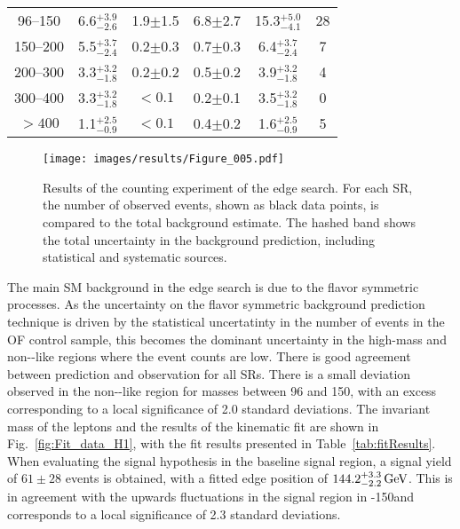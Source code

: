 \begin{table}[!hbtp]
\begin{tabular}{ c  c  c  c  c  c}
96--150   &  6.6$^{+3.9}_{-2.6}$    & 1.9$\pm$1.5   & 6.8$\pm$2.7  &  15.3$^{+5.0}_{-4.1}$ & 28 \\
150--200  &  5.5$^{+3.7}_{-2.4}$    & 0.2$\pm$0.3   & 0.7$\pm$0.3  &  6.4$^{+3.7}_{-2.4}$ & 7 \\
200--300  &  3.3$^{+3.2}_{-1.8}$    & 0.2$\pm$0.2   & 0.5$\pm$0.2  &  3.9$^{+3.2}_{-1.8}$ & 4 \\
300--400  &  3.3$^{+3.2}_{-1.8}$    & $< 0.1$       & 0.2$\pm$0.1  &  3.5$^{+3.2}_{-1.8}$ & 0 \\
$> 400$   &  1.1$^{+2.5}_{-0.9}$    & $< 0.1$       & 0.4$\pm$0.2  &  1.6$^{+2.5}_{-0.9}$ & 5 \\
\hline
\hline
\end{tabular}
\end{table}
\begin{figure}[htbp!]
\begin{center}
\texttt{[image: images/results/Figure\_005.pdf]}
\caption{Results of the counting experiment of the edge search. For each SR, the number of observed events, shown as black data points, is compared to the total background estimate.  The hashed band shows the total uncertainty in the background prediction, including statistical and systematic sources.}
\label{fig:edgeResults}
\end{center}
\end{figure}                                                                                                                                                               
The main SM background in the edge search is due to the flavor symmetric processes. 
As the uncertainty on the flavor symmetric background prediction technique is driven by the statistical uncertatinty in the number of events in the OF control sample, this becomes the dominant uncertainty in the high-mass and non-\ttbar-like regions where the event counts are low. 
There is good agreement between prediction and observation for all SRs. 
There is a small deviation observed in the non-\ttbar-like region for masses between 96 and 150\GeV, with an excess corresponding to a local significance of 2.0 standard deviations.
The invariant mass of the leptons and the results of the kinematic fit are shown in Fig.~\ref{fig:Fit_data_H1}, with the fit results presented in Table~\ref{tab:fitResults}.
When evaluating the signal hypothesis in the baseline signal region, a signal yield of $61\pm28$ events is obtained, with a fitted edge position of $144.2^{+3.3}_{-2.2}\,\text{Ge\hspace{-.08em}V}$. 
This is in agreement with the upwards fluctuations in the signal region in -150\GeV and corresponds to a local significance of 2.3 standard deviations.
